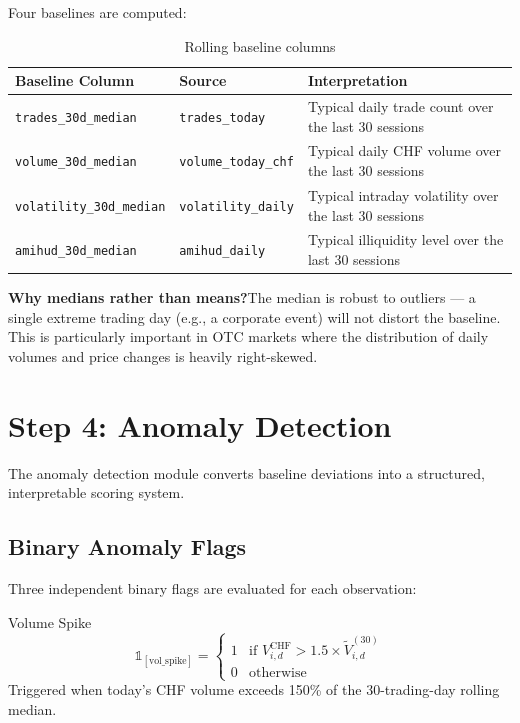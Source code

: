 \documentclass[
  11pt,
  a4paper,
  twoside,
  openany
]{report}
\begin{document}
Four baselines are computed:

\begin{table}[H]
\centering
\caption{Rolling baseline columns}
\label{tab:baselines}
\begin{tabularx}{\textwidth}{l l X}
\toprule
\textbf{Baseline Column} & \textbf{Source} & \textbf{Interpretation} \\
\midrule
\texttt{trades\_30d\_median}     & \texttt{trades\_today}      & Typical daily trade count over the last 30 sessions \\
\texttt{volume\_30d\_median}     & \texttt{volume\_today\_chf}  & Typical daily CHF volume over the last 30 sessions \\
\texttt{volatility\_30d\_median} & \texttt{volatility\_daily}   & Typical intraday volatility over the last 30 sessions \\
\texttt{amihud\_30d\_median}     & \texttt{amihud\_daily}       & Typical illiquidity level over the last 30 sessions \\
\bottomrule
\end{tabularx}
\end{table}

\begin{insightbox}
\textbf{Why medians rather than means?}\;The median is robust to outliers — a single extreme trading day (e.g., a corporate event) will not distort the baseline.  This is particularly important in OTC markets where the distribution of daily volumes and price changes is heavily right-skewed.
\end{insightbox}

\section{Step 4: Anomaly Detection}

The anomaly detection module converts baseline deviations into a structured, interpretable scoring system.

\subsection{Binary Anomaly Flags}

Three independent binary flags are evaluated for each observation:

\begin{formulabox}{Volume Spike}
\[
  \mathbb{1}_{[\text{vol\_spike}]} =
  \begin{cases}
    1 & \text{if } V_{i,d}^{\text{CHF}} > 1.5 \times \tilde{V}_{i,d}^{(30)} \\
    0 & \text{otherwise}
  \end{cases}
\]
Triggered when today's CHF volume exceeds 150\% of the 30-trading-day rolling median.
\end{formulabox}
\end{document}
